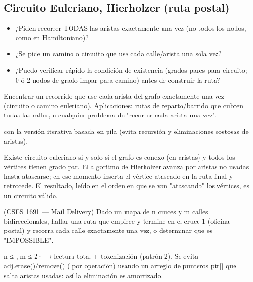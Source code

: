 \subsection{Circuito Euleriano, Hierholzer (ruta postal)}
\label{alg:4-5}


\begin{itemize}
\item ¿Piden recorrer TODAS las aristas exactamente una vez (no todos los nodos, como en Hamiltoniano)?
\item ¿Se pide un camino o circuito que use cada calle/arista una sola vez?
\item ¿Puedo verificar rápido la condición de existencia (grados pares para circuito; 0 ó 2 nodos de grado impar para camino) antes de construir la ruta?
\end{itemize}

 Encontrar un recorrido que use cada arista del grafo exactamente una vez (circuito o camino euleriano). Aplicaciones: rutas de reparto/barrido que cubren todas las calles, o cualquier problema de "recorrer cada arista una vez".

  con la versión iterativa basada en pila (evita recursión y eliminaciones costosas de aristas).

 Existe circuito euleriano si y solo si el grafo es conexo (en aristas) y todos los vértices tienen grado par. El algoritmo de Hierholzer avanza por aristas no usadas hasta atascarse; en ese momento inserta el vértice atascado en la ruta final y retrocede. El resultado, leído en el orden en que se van "atascando" los vértices, es un circuito válido.~\cite{hierholzer1873}


(CSES 1691 — Mail Delivery) Dado un mapa de n cruces y m calles bidireccionales, hallar una ruta que empiece y termine en el cruce 1 (oficina postal) y recorra cada calle exactamente una vez, o determinar que es "IMPOSSIBLE".

 n ≤ , m ≤ 2· → lectura total + tokenización (patrón 2). Se evita adj.erase()/remove() ( por operación) usando un arreglo de punteros ptr[] que salta aristas usadas: así la eliminación es  amortizado.


